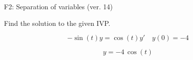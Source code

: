 \begin{exercise}
  \begin{exerciseTitle}F2: Separation of variables (ver. 14)\end{exerciseTitle}
  \begin{exerciseStatement}
    
Find the solution to the given IVP.

    
\[-\sin\left(t\right) y= \cos\left(t\right) y'\hspace{1em} y\left( 0 \right)= -4\]

  \end{exerciseStatement}
  \begin{exerciseAnswer}
    
\[y= -4 \, \cos\left(t\right)\]

  \end{exerciseAnswer}
\end{exercise}